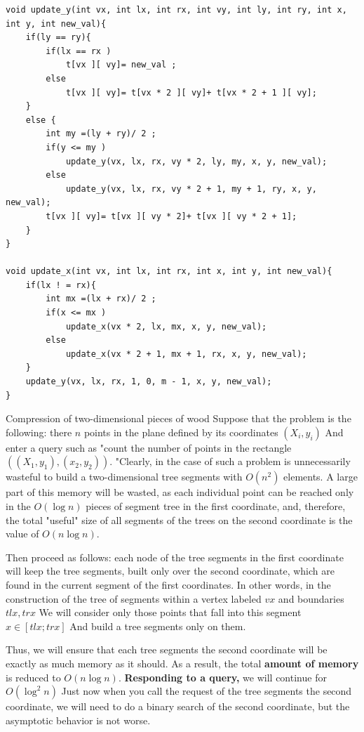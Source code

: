 \begin{verbatim}
void update_y(int vx, int lx, int rx, int vy, int ly, int ry, int x, int y, int new_val){
    if(ly == ry){
        if(lx == rx )
            t[vx ][ vy]= new_val ;
        else
            t[vx ][ vy]= t[vx * 2 ][ vy]+ t[vx * 2 + 1 ][ vy];
    }
    else {
        int my =(ly + ry)/ 2 ;
        if(y <= my )
            update_y(vx, lx, rx, vy * 2, ly, my, x, y, new_val);
        else
            update_y(vx, lx, rx, vy * 2 + 1, my + 1, ry, x, y, new_val);
        t[vx ][ vy]= t[vx ][ vy * 2]+ t[vx ][ vy * 2 + 1];
    }
}
 
void update_x(int vx, int lx, int rx, int x, int y, int new_val){
    if(lx ! = rx){
        int mx =(lx + rx)/ 2 ;
        if(x <= mx )
            update_x(vx * 2, lx, mx, x, y, new_val);
        else
            update_x(vx * 2 + 1, mx + 1, rx, x, y, new_val);
    }
    update_y(vx, lx, rx, 1, 0, m - 1, x, y, new_val);
} 
\end{verbatim}
Compression of two-dimensional pieces of wood
Suppose that the problem is the following: there $n$ points in the plane defined by its coordinates $(X_i, y_i)$ And enter a query such as "count the number of points in the rectangle $((X_1, y_1), (x_2, y_2))$. "Clearly, in the case of such a problem is unnecessarily wasteful to build a two-dimensional tree segments with $O (n ^ 2)$ elements. A large part of this memory will be wasted, as each individual point can be reached only in the $O (\log n)$ pieces of segment tree in the first coordinate, and, therefore, the total "useful" size of all segments of the trees on the second coordinate is the value of $O (n \log n)$.

Then proceed as follows: each node of the tree segments in the first coordinate will keep the tree segments, built only over the second coordinate, which are found in the current segment of the first coordinates. In other words, in the construction of the tree of segments within a vertex labeled $vx$ and boundaries $tlx, trx$ We will consider only those points that fall into this segment $x \in [tlx; trx]$ And build a tree segments only on them.

Thus, we will ensure that each tree segments the second coordinate will be exactly as much memory as it should. As a result, the total \textbf{amount of memory} is reduced to $O (n \log n)$. \textbf{Responding to a query,} we will continue for $O (\log ^ 2 n)$ Just now when you call the request of the tree segments the second coordinate, we will need to do a binary search of the second coordinate, but the asymptotic behavior is not worse.


